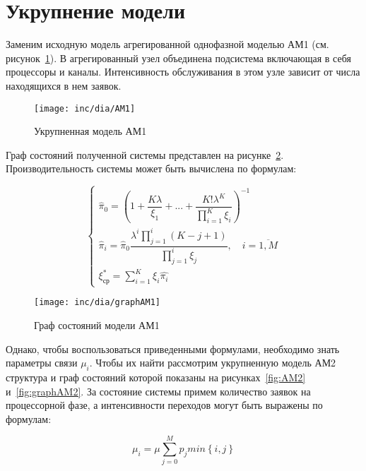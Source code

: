 \documentclass[utf8x, 12pt]{G7-32} %
\begin{document}
\newpage

\section{Укрупнение модели}

Заменим исходную модель агрегированной однофазной моделью АМ1 (см. рисунок~\ref{fig:AM1}). В агрегированный узел объединена подсистема включающая в себя процессоры и каналы. Интенсивность обслуживания в этом узле зависит от числа находящихся в нем заявок.

\begin{figure}[ht]
\centering
\texttt{[image: inc/dia/AM1]}
\caption{Укрупненная модель АМ1}
\label{fig:AM1}
\end{figure}

Граф состояний полученной системы представлен на рисунке~\ref{fig:graphAM1}. Производительность системы может быть вычислена по формулам:


\begin{equation}
\label{eq:AM1}
\left\{
   \begin{array}{lcl}
	\hat{\pi}_{0} = \left( 1 + \dfrac{K \lambda}{\xi_1} +  ... + \dfrac{K! \lambda^{K}}{\prod \limits_{i=1}^K \xi_i} \right) ^{-1} \\
	\hat{\pi}_{i} = \hat{\pi}_{0} \dfrac{\lambda^{i}\prod \limits_{j=1}^{i} (K-j+1)}{\prod \limits_{j=1}^i \xi_{j}}, \quad i = \overline{1,M}  \\ 
	\xi_{ср}^{*}=\sum \limits_{i=1}^K \xi_i \hat{\pi_i}
   \end{array}
\right.
\end{equation}


\begin{figure}[ht]
\centering
\texttt{[image: inc/dia/graphAM1]}
\caption{Граф состояний модели АМ1}
\label{fig:graphAM1}
\end{figure}

Однако, чтобы воспользоваться приведенными формулами, необходимо знать параметры связи $\mu_i$. Чтобы их найти рассмотрим укрупненную модель АМ2 структура и граф состояний которой показаны на рисунках~\ref{fig:AM2} и~\ref{fig:graphAM2}. За состояние системы примем количество заявок на процессорной фазе, а интенсивности переходов могут быть выражены по формулам:

\begin{equation}
\label{eq:mu}
\mu_i = \mu \sum \limits_{j=0}^M p_j min \left\lbrace i, j \right\rbrace
\end{equation}
\end{document}

